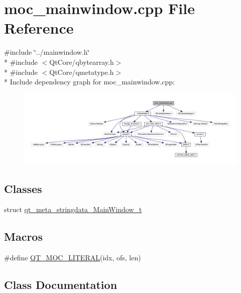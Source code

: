 \hypertarget{a00015}{\section{moc\+\_\+mainwindow.\+cpp File Reference}
\label{a00015}
}
{\ttfamily \#include \char`\"{}../mainwindow.\+h\char`\"{}}\\*
{\ttfamily \#include $<$Qt\+Core/qbytearray.\+h$>$}\\*
{\ttfamily \#include $<$Qt\+Core/qmetatype.\+h$>$}\\*
Include dependency graph for moc\+\_\+mainwindow.\+cpp\+:
\nopagebreak
\begin{figure}[H]
\begin{center}
\leavevmode
\includegraphics[width=350pt]{dd/dae/a00163}
\end{center}
\end{figure}
\subsection*{Classes}
\begin{DoxyCompactItemize}
\item 
struct \hyperlink{a00015_d9/df8/a00096}{qt\+\_\+meta\+\_\+stringdata\+\_\+\+Main\+Window\+\_\+t}
\end{DoxyCompactItemize}
\subsection*{Macros}
\begin{DoxyCompactItemize}
\item 
\#define \hyperlink{a00015_a75bb9482d242cde0a06c9dbdc6b83abe}{Q\+T\+\_\+\+M\+O\+C\+\_\+\+L\+I\+T\+E\+R\+A\+L}(idx, ofs, len)
\end{DoxyCompactItemize}


\subsection{Class Documentation}
\label{d9/df8/a00096}
\hypertarget{a00015_d9/df8/a00096}{}
